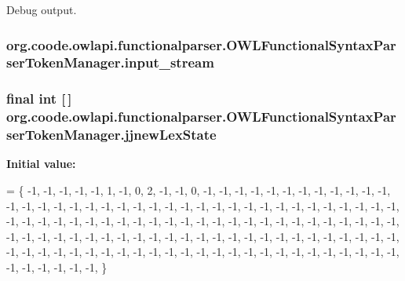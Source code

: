 Debug output. \hypertarget{classorg_1_1coode_1_1owlapi_1_1functionalparser_1_1_o_w_l_functional_syntax_parser_token_manager_a086cef9a2411c7e7f5cb6a8b1b10b826}{
\subsubsection[{input\-\_\-stream}]{ org.\-coode.\-owlapi.\-functionalparser.\-O\-W\-L\-Functional\-Syntax\-Parser\-Token\-Manager.\-input\-\_\-stream\hspace{0.3cm}{\ttfamily [protected]}}}\label{classorg_1_1coode_1_1owlapi_1_1functionalparser_1_1_o_w_l_functional_syntax_parser_token_manager_a086cef9a2411c7e7f5cb6a8b1b10b826}
\hypertarget{classorg_1_1coode_1_1owlapi_1_1functionalparser_1_1_o_w_l_functional_syntax_parser_token_manager_a5534edaab674779ff1383d20f034142b}{
\subsubsection[{jjnew\-Lex\-State}]{\setlength{\rightskip}{0pt plus 5cm}final int \mbox{[}$\,$\mbox{]} org.\-coode.\-owlapi.\-functionalparser.\-O\-W\-L\-Functional\-Syntax\-Parser\-Token\-Manager.\-jjnew\-Lex\-State\hspace{0.3cm}{\ttfamily [static]}}}\label{classorg_1_1coode_1_1owlapi_1_1functionalparser_1_1_o_w_l_functional_syntax_parser_token_manager_a5534edaab674779ff1383d20f034142b}
{\bfseries Initial value\-:}
\begin{DoxyCode}
= \{
   -1, -1, -1, -1, -1, 1, -1, 0, 2, -1, -1, 0, -1, -1, -1, -1, -1, -1, -1, -1, -1, -1, -1, -1, -1, 
   -1, -1, -1, -1, -1, -1, -1, -1, -1, -1, -1, -1, -1, -1, -1, -1, -1, -1, -1, -1, -1, -1, -1, -1, -1, 
   -1, -1, -1, -1, -1, -1, -1, -1, -1, -1, -1, -1, -1, -1, -1, -1, -1, -1, -1, -1, -1, -1, -1, -1, -1, 
   -1, -1, -1, -1, -1, -1, -1, -1, -1, -1, -1, -1, -1, -1, -1, -1, -1, -1, -1, -1, -1, -1, -1, -1, -1, 
   -1, -1, -1, -1, -1, -1, -1, -1, -1, -1, -1, -1, -1, -1, -1, -1, -1, -1, -1, -1, -1, -1, -1, -1, -1, 
   -1, -1, -1, -1, -1, 
\}
\end{DoxyCode}
